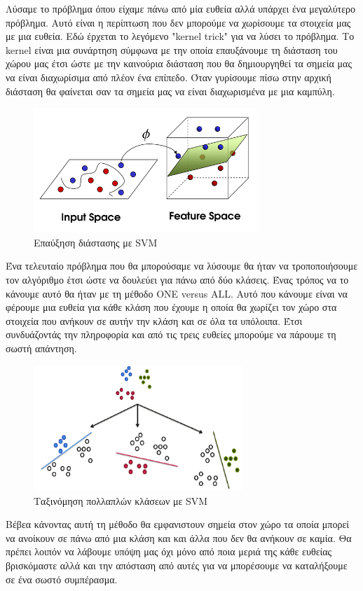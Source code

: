 Λύσαμε το πρόβλημα όπου είχαμε πάνω από μία ευθεία αλλά υπάρχει ένα μεγαλύτερο πρόβλημα. Αυτό
είναι η περίπτωση που δεν μπορούμε να χωρίσουμε τα στοιχεία μας με μια ευθεία. Εδώ έρχεται το
λεγόμενο "\textlatin{kernel trick}" για να λύσει το πρόβλημα. Το \textlatin{kernel} είναι μια
συνάρτηση σύμφωνα με την οποία επαυξάνουμε τη διάσταση του χώρου μας έτσι ώστε με την καινούρια
διάσταση που θα δημιουργηθεί τα σημεία μας να είναι διαχωρίσιμα από πλέον ένα επίπεδο. Όταν
γυρίσουμε πίσω στην αρχική διάσταση θα φαίνεται σαν τα σημεία μας να είναι διαχωρισμένα με μια
καμπύλη.
\begin{figure}[H]
    \centering
    \includegraphics[width=0.75\textwidth]{images/svmdiminc.png}
    \caption{Επαύξηση διάστασης με \textlatin{SVM}}
\end{figure}

Ένα τελευταίο πρόβλημα που θα μπορούσαμε να λύσουμε θα ήταν να τροποποιήσουμε τον αλγόριθμο έτσι
ώστε να δουλεύει για πάνω από δύο κλάσεις. Ένας τρόπος να το κάνουμε αυτό θα ήταν με τη μέθοδο
\textlatin{ONE versus ALL}. Αυτό που κάνουμε είναι να φέρουμε μια ευθεία για κάθε κλάση που έχουμε
η οποία θα χωρίζει τον χώρο στα στοιχεία που ανήκουν σε αυτήν την κλάση και σε όλα τα υπόλοιπα.
Έτσι συνδυάζοντάς την πληροφορία και από τις τρεις ευθείες μπορούμε να πάρουμε τη σωστή απάντηση.
\begin{figure}[H]
    \centering
    \includegraphics[width=0.7\textwidth]{images/svmonevsall.png}
    \caption{Ταξινόμηση πολλαπλών κλάσεων με \textlatin{SVM}}
\end{figure}
Βέβεα κάνοντας αυτή τη μέθοδο θα εμφανιστουν σημεία στον χώρο τα οποία μπορεί να ανοίκουν σε πάνω
από μια κλάση και και άλλα που δεν θα ανήκουν σε καμία. Θα πρέπει λοιπόν να λάβουμε υπόψη μας όχι
μόνο από ποια μεριά της κάθε ευθείας βρισκόμαστε αλλά και την απόσταση από αυτές για να μπορέσουμε
να καταλήξουμε σε ένα σωστό συμπέρασμα.

